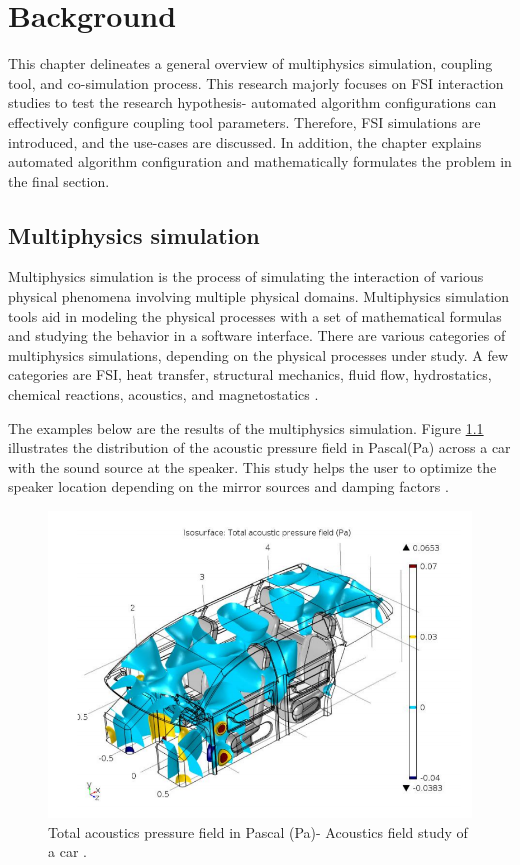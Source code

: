 \chapter{Background}
\label{chapter:background}

This chapter delineates a general overview of multiphysics simulation, coupling tool, and co-simulation process. This research majorly focuses on FSI interaction studies to test the research hypothesis- automated algorithm configurations can effectively configure coupling tool parameters. Therefore, FSI simulations are introduced, and the use-cases are discussed. In addition, the chapter explains automated algorithm configuration and mathematically formulates the problem in the final section.

\section{Multiphysics simulation}
Multiphysics simulation is the process of simulating the interaction of various physical phenomena involving multiple physical domains. Multiphysics simulation tools aid in modeling the physical processes with a set of mathematical formulas and studying the behavior in a software interface. There are various categories of multiphysics simulations, depending on the physical processes under study. A few categories are FSI, heat transfer, structural mechanics, fluid flow, hydrostatics, chemical reactions, acoustics, and magnetostatics \cite{FSI_Bungartz}.

The examples below are the results of the multiphysics simulation. Figure \ref{Fig:car-acoustics} illustrates the distribution of the acoustic pressure field in Pascal(Pa) across a car with the sound source at the speaker. This study helps the user to optimize the speaker location depending on the mirror sources and damping factors \cite{car-acoustics}.

\begin{figure}[!ht]
\centering
\includegraphics[width=\textwidth]{images/car-acoustics.png}
\captionsetup{justification=justified}
\caption[Multiphysics simulation example- Acoustic field study of a car]{Total acoustics pressure field in Pascal (Pa)- Acoustics field study of a car \cite{car-acoustics}.}
\label{Fig:car-acoustics}
\end{figure}


